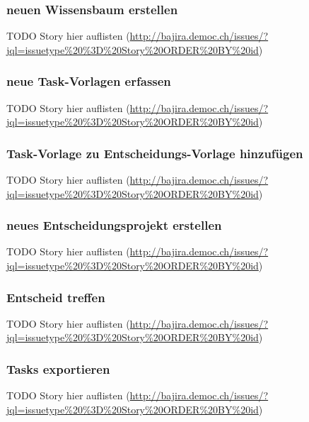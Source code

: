 	\subsubsection{neuen Wissensbaum erstellen}
		TODO Story hier auflisten (\url{http://bajira.democ.ch/issues/?jql=issuetype\%20\%3D\%20Story\%20ORDER\%20BY\%20id})

	\subsubsection{neue Task-Vorlagen erfassen}
		TODO Story hier auflisten (\url{http://bajira.democ.ch/issues/?jql=issuetype\%20\%3D\%20Story\%20ORDER\%20BY\%20id})

	\subsubsection{Task-Vorlage zu Entscheidungs-Vorlage hinzufügen}
		TODO Story hier auflisten (\url{http://bajira.democ.ch/issues/?jql=issuetype\%20\%3D\%20Story\%20ORDER\%20BY\%20id})

	\subsubsection{neues Entscheidungsprojekt erstellen}
		TODO Story hier auflisten (\url{http://bajira.democ.ch/issues/?jql=issuetype\%20\%3D\%20Story\%20ORDER\%20BY\%20id})

	\subsubsection{Entscheid treffen}
		TODO Story hier auflisten (\url{http://bajira.democ.ch/issues/?jql=issuetype\%20\%3D\%20Story\%20ORDER\%20BY\%20id})

	\subsubsection{Tasks exportieren}
		TODO Story hier auflisten (\url{http://bajira.democ.ch/issues/?jql=issuetype\%20\%3D\%20Story\%20ORDER\%20BY\%20id})

	
